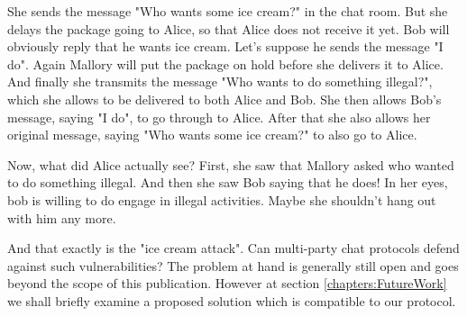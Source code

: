 She sends the message "Who wants some ice cream?" in the chat room.
But she delays the package going to Alice, so that Alice does not receive it yet.
Bob will obviously reply that he wants ice cream.
Let's suppose he sends the message "I do".
Again Mallory will put the package on hold before she delivers it to Alice.
And finally she transmits the message "Who wants to do something illegal?", which she allows to be delivered to both Alice and Bob.
She then allows Bob's message, saying "I do", to go through to Alice.
After that she also allows her original message, saying "Who wants some ice cream?" to also go to Alice.

Now, what did Alice actually see?
First, she saw that Mallory asked who wanted to do something illegal.
And then she saw Bob saying that he does!
In her eyes, bob is willing to do engage in illegal activities.
Maybe she shouldn't hang out with him any more.

And that exactly is the "ice cream attack".
Can multi-party chat protocols defend against such vulnerabilities?
The problem at hand is generally still open and goes beyond the scope of this publication.
However at section \ref{chapters:FutureWork} we shall briefly examine a proposed solution which is compatible to our protocol.
